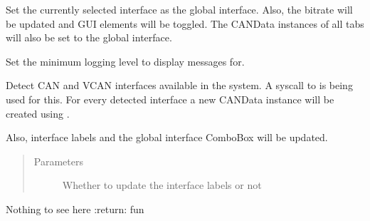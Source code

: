 \documentclass[letterpaper,10pt,english]{sphinxmanual}
\begin{document}
\begin{fulllineitems}
\begin{fulllineitems}
\label{\detokenize{src:src.MainTab.MainTab.applyGlobalInterfaceSettings}}
Set the currently selected interface as the global interface.
Also, the bitrate will be updated and GUI elements will be toggled.
The CANData instances of all  tabs will also be set to the global interface.

\end{fulllineitems}


\begin{fulllineitems}
\label{\detokenize{src:src.MainTab.MainTab.applyLogLevelSetting}}
Set the minimum logging level to display messages for.

\end{fulllineitems}


\begin{fulllineitems}
\label{\detokenize{src:src.MainTab.MainTab.detectCANInterfaces}}
Detect CAN and VCAN interfaces available in the system. A syscall to  is being used for this.
For every detected interface a new CANData instance will be
created using .

Also, interface labels and the global interface ComboBox will be updated.
\begin{quote}\begin{description}
\item[{Parameters}] \leavevmode
{} \textendash{} Whether to update the interface labels or not

\end{description}\end{quote}

\end{fulllineitems}


\begin{fulllineitems}
\label{\detokenize{src:src.MainTab.MainTab.easterEgg}}
Nothing to see here
:return: fun


\end{fulllineitems}
\end{fulllineitems}
\end{document}
